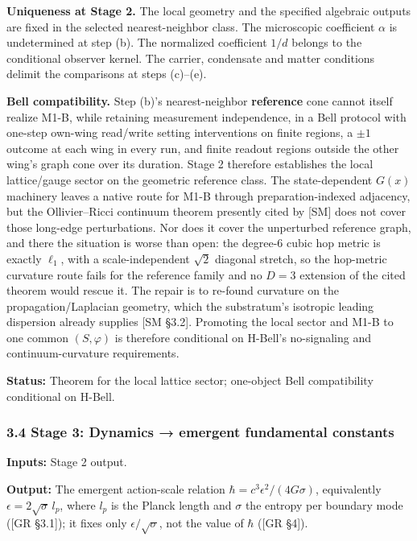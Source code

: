 \documentclass[
]{article}
\begin{document}
\textbf{Uniqueness at Stage 2.} The local geometry and the specified
algebraic outputs are fixed in the selected nearest-neighbor class. The
microscopic coefficient \(\alpha\) is undetermined at step (b). The
normalized coefficient \(1/d\) belongs to the conditional observer
kernel. The carrier, condensate and matter conditions delimit the
comparisons at steps (c)--(e).

\textbf{Bell compatibility.} Step (b)'s nearest-neighbor
\textbf{reference} cone cannot itself realize M1-B, while retaining
measurement independence, in a Bell protocol with one-step own-wing
read/write setting interventions on finite regions, a \(\pm1\) outcome
at each wing in every run, and finite readout regions outside the other
wing's graph cone over its duration. Stage 2 therefore establishes the
local lattice/gauge sector on the geometric reference class. The
state-dependent \(G(x)\) machinery leaves a native route for M1-B
through preparation-indexed adjacency, but the Ollivier--Ricci continuum
theorem presently cited by {[}SM{]} does not cover those long-edge
perturbations. Nor does it cover the unperturbed reference graph, and
there the situation is worse than open: the degree-\(6\) cubic hop
metric is exactly \(\ell_1\), with a scale-independent \(\sqrt2\)
diagonal stretch, so the hop-metric curvature route fails for the
reference family and no \(D=3\) extension of the cited theorem would
rescue it. The repair is to re-found curvature on the
propagation/Laplacian geometry, which the substratum's isotropic leading
dispersion already supplies {[}SM §3.2{]}. Promoting the local sector
and M1-B to one common \((S,\varphi)\) is therefore conditional on
H-Bell's no-signaling and continuum-curvature requirements.

\textbf{Status:} Theorem for the local lattice sector; one-object Bell
compatibility conditional on H-Bell.

\hypertarget{stage-3-dynamics-emergent-fundamental-constants}{%
\subsubsection{3.4 Stage 3: Dynamics → emergent fundamental
constants}\label{stage-3-dynamics-emergent-fundamental-constants}}

\textbf{Inputs:} Stage 2 output.

\textbf{Output:} The emergent action-scale relation
\(\hbar = c^3 \epsilon^2 / (4G\sigma)\), equivalently
\(\epsilon = 2\sqrt{\sigma}\,l_p\), where \(l_p\) is the Planck length
and \(\sigma\) the entropy per boundary mode ({[}GR §3.1{]}); it fixes
only \(\epsilon/\sqrt{\sigma}\), not the value of \(\hbar\) ({[}GR
§4{]}).
\end{document}
